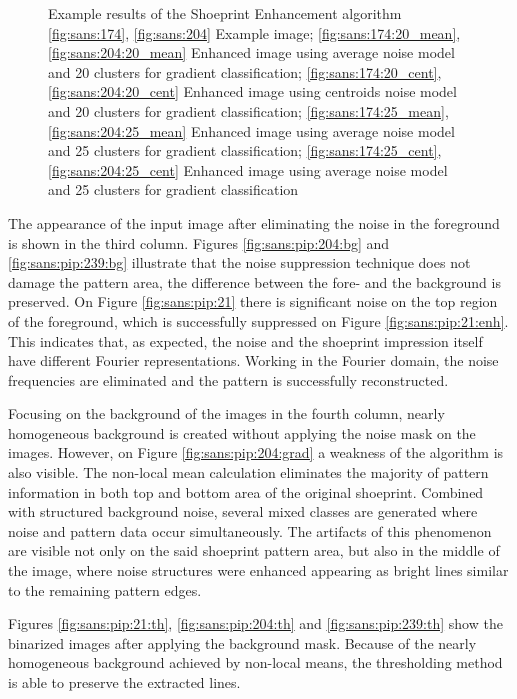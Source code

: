 \documentclass[draft,final]{vutinfth} %
\begin{document}
{\begin{figure}[H]
\caption{Example results of the Shoeprint Enhancement algorithm
				\ref{fig:sans:174}, \ref{fig:sans:204} Example image; \ref{fig:sans:174:20_mean}, \ref{fig:sans:204:20_mean} Enhanced image using average noise model and 20 clusters for gradient classification; \ref{fig:sans:174:20_cent}, \ref{fig:sans:204:20_cent} Enhanced image using centroids noise model and 20 clusters for gradient classification; \ref{fig:sans:174:25_mean}, \ref{fig:sans:204:25_mean} Enhanced image using average noise model and 25 clusters for gradient classification; \ref{fig:sans:174:25_cent}, \ref{fig:sans:204:25_cent} Enhanced image using average noise model and 25 clusters for gradient classification}
\label{fig:sans:res2}

\end{figure}
}

\par
The appearance of the input image after eliminating the noise in the foreground is shown in the third column.
Figures  \ref{fig:sans:pip:204:bg} and \ref{fig:sans:pip:239:bg} illustrate that the noise suppression technique does not damage the pattern area, the difference between the fore- and the background is preserved.
On Figure \ref{fig:sans:pip:21} there is significant noise on the top region of the foreground, which is successfully suppressed on Figure \ref{fig:sans:pip:21:enh}.
This indicates that, as expected, the noise and the shoeprint impression itself have different Fourier representations.
Working in the Fourier domain, the noise frequencies are eliminated and the pattern is successfully reconstructed.
\par
Focusing on the background of the images in the fourth column, nearly homogeneous background is created without applying the noise mask on the images.
However, on Figure \ref{fig:sans:pip:204:grad} a weakness of the algorithm is also visible.
The non-local mean calculation eliminates the majority of pattern information in both top and bottom area of the original shoeprint.
Combined with structured background noise, several mixed classes are generated where noise and pattern data occur simultaneously.
The artifacts of this phenomenon are visible not only on the said shoeprint pattern area, but also in the middle of the image, where noise structures were enhanced appearing as bright lines similar to the remaining pattern edges.
\par
Figures \ref{fig:sans:pip:21:th}, \ref{fig:sans:pip:204:th} and \ref{fig:sans:pip:239:th} show the binarized images after applying the background mask.
Because of the nearly homogeneous background achieved by non-local means, the thresholding method is able to preserve the extracted lines.
\end{document}
